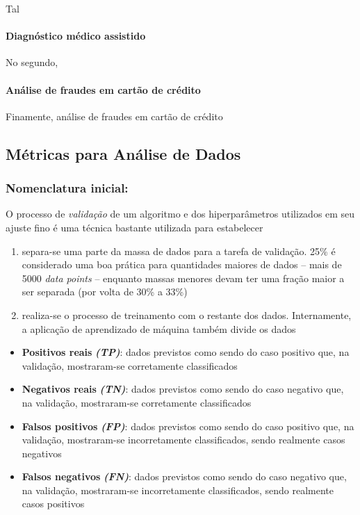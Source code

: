 \documentclass[]{article}
\let\oldparagraph\paragraph
\renewcommand{\paragraph}[1]{\oldparagraph{#1}\mbox{}}
\begin{document}
Tal

\hypertarget{header-n1095}{%
\paragraph{Diagnóstico médico assistido}\label{header-n1095}}

No segundo,

\hypertarget{header-n1098}{%
\paragraph{Análise de fraudes em cartão de crédito}\label{header-n1098}}

Finamente, análise de fraudes em cartão de crédito

\hypertarget{header-n1101}{%
\subsection{Métricas para Análise de Dados}\label{header-n1101}}

\hypertarget{header-n1102}{%
\subsubsection{Nomenclatura inicial:}\label{header-n1102}}

O processo de \emph{validação} de um algoritmo e dos hiperparâmetros
utilizados em seu ajuste fino é uma técnica bastante utilizada para
estabelecer

\begin{enumerate}
\def\labelenumi{\arabic{enumi}.}
\item
  separa-se uma parte da massa de dados para a tarefa de validação. 25\%
  é considerado uma boa prática para quantidades maiores de dados --
  mais de 5000 \emph{data points} -- enquanto massas menores devam ter
  uma fração maior a ser separada (por volta de 30\% a 33\%)
\item
  realiza-se o processo de treinamento com o restante dos dados.
  Internamente, a aplicação de aprendizado de máquina também divide os
  dados 
\end{enumerate}

\begin{itemize}
\item
  \textbf{Positivos reais} \textbf{\emph{(TP)}}: dados previstos como
  sendo do caso positivo que, na validação, mostraram-se corretamente
  classificados
\item
  \textbf{Negativos reais} \textbf{\emph{(TN)}}: dados previstos como
  sendo do caso negativo que, na validação, mostraram-se corretamente
  classificados
\item
  \textbf{Falsos positivos} \textbf{\emph{(FP)}}: dados previstos como
  sendo do caso positivo que, na validação, mostraram-se incorretamente
  classificados, sendo realmente casos negativos
\item
  \textbf{Falsos negativos} \textbf{\emph{(FN)}}: dados previstos como
  sendo do caso negativo que, na validação, mostraram-se incorretamente
  classificados, sendo realmente casos positivos 
\end{itemize}
\end{document}

